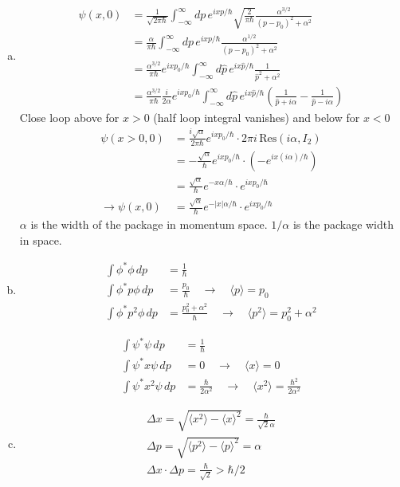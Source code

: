 \documentclass[10pt,a4paper]{book}
\theoremstyle{definition}
\begin{document}
\begin{enumerate}[(a)]
\item
\begin{align}
\psi(x,0)
&=\frac{1}{\sqrt{2\pi\hbar}}\int_{-\infty}^\infty dp\,e^{ixp/\hbar}\sqrt{\frac{2}{\pi\hbar}}\frac{\alpha^{3/2}}{(p-p_0)^2+\alpha^2}\\
&=\frac{\alpha}{\pi\hbar}\int_{-\infty}^\infty dp\,e^{ixp/\hbar}\frac{\alpha^{1/2}}{(p-p_0)^2+\alpha^2}\\
&=\frac{\alpha^{3/2}}{\pi\hbar}e^{ixp_0/\hbar}\int_{-\infty}^\infty d\hat{p}\,e^{ix\hat{p}/\hbar}\frac{1}{\hat{p}^2+\alpha^2}\\
&=\frac{\alpha^{3/2}}{\pi\hbar}\frac{i}{2\alpha}e^{ixp_0/\hbar}\int_{-\infty}^\infty d\hat{p}\,e^{ix\hat{p}/\hbar}\left(\frac{1}{\hat{p}+i\alpha}-\frac{1}{\hat{p}-i\alpha}\right)
\end{align}
Close loop above for $x>0$ (half loop integral vanishes) and below for $x<0$
\begin{align}
\psi(x>0,0)
&=\frac{i\sqrt{\alpha}}{2\pi\hbar}e^{ixp_0/\hbar}\cdot 2\pi i\,\text{Res}(i\alpha,I_2)\\
&=-\frac{\sqrt{\alpha}}{\hbar}e^{ixp_0/\hbar}\cdot\left(-e^{ix(i\alpha)/\hbar}\right)\\
&=\frac{\sqrt{\alpha}}{\hbar}e^{-x\alpha/\hbar}\cdot e^{ixp_0/\hbar}\\
\rightarrow\psi(x,0)
&=\frac{\sqrt{\alpha}}{\hbar}e^{-|x|\alpha/\hbar}\cdot e^{ixp_0/\hbar}
\end{align}
$\alpha$ is the width of the package in momentum space. $1/\alpha$ is the package width in space.
\item
\begin{align}
\int\phi^*\phi\,dp&=\frac{1}{\hbar}\\
\int\phi^* p \phi\,dp&=\frac{p_0}{\hbar}\quad\rightarrow\quad\langle p\rangle=p_0\\
\int\phi^* p^2 \phi\,dp&=\frac{p_0^2+\alpha^2}{\hbar}\quad\rightarrow\quad\langle p^2\rangle=p_0^2+\alpha^2
\end{align}

\begin{align}
\int\psi^*\psi\,dp&=\frac{1}{\hbar}\\
\int\psi^* x \psi\,dp&=0\quad\rightarrow\quad\langle x\rangle=0\\
\int\psi^* x^2 \psi\,dp&=\frac{\hbar}{2\alpha^2}\quad\rightarrow\quad\langle x^2\rangle=\frac{\hbar^2}{2\alpha^2}
\end{align}
\item
\begin{align}
\Delta x=\sqrt{\langle x^2 \rangle-\langle x \rangle^2}=\frac{\hbar}{\sqrt{2}\alpha}\\
\Delta p=\sqrt{\langle p^2 \rangle-\langle p \rangle^2}=\alpha\\
\Delta x\cdot\Delta p=\frac{\hbar}{\sqrt{2}}>\hbar/2
\end{align}
\end{enumerate}
\end{document}
